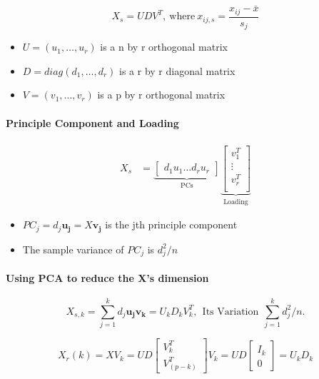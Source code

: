 \documentclass[]{article}
\providecommand{\tightlist}{%
  \setlength{\itemsep}{0pt}\setlength{\parskip}{0pt}}
\let\oldparagraph\paragraph
\renewcommand{\paragraph}[1]{\oldparagraph{#1}\mbox{}}
\begin{document}
\[
X_s = UDV^T, ~\text{where} ~x_{ij,s} = \frac{x_{ij} - \bar{x}}{s_j}
\]

\begin{itemize}
\tightlist
\item
  \(U = (u_1, \dots, u_r)\) is a n by r orthogonal matrix\\
\item
  \(D = diag(d_1, \dots, d_r)\) is a r by r diagonal matrix\\
\item
  \(V = (v_1, \dots, v_r)\) is a p by r orthogonal matrix
\end{itemize}

\paragraph{Principle Component and
Loading}\label{principle-component-and-loading}

\begin{align*} 
X_s &= \underbrace{\begin{bmatrix} d_1u_1 \hdots  d_ru_r \end{bmatrix} }_\text{PCs}
\underbrace{\begin{bmatrix} v_1^T \\
\vdots \\
v_r^T \\
\end{bmatrix}}_\text{Loading}
\end{align*}

\begin{itemize}
\tightlist
\item
  \(PC_j = d_j\pmb{u_j} = X\pmb{v_j}\) is the jth principle component
\item
  The sample variance of \(PC_j\) is \(d_j^2/n\)
\end{itemize}

\paragraph{Using PCA to reduce the X's
dimension}\label{using-pca-to-reduce-the-xs-dimension}

\[
  X_{s,k} = \sum_{j=1}^{k}d_j\pmb{u_jv_k} = U_kD_kV_k^T,~~ \text{Its Variation} ~~  \sum_{j=1}^kd_j^2/n.
  \]

\[
  X_r(k) = XV_k = UD \begin{bmatrix} 
  V_k^T \\
  V_{(p-k)}^T 
  \end{bmatrix} V_k=  UD \begin{bmatrix} 
  I_k \\
  0 
  \end{bmatrix}= U_kD_k
  \]
\end{document}
